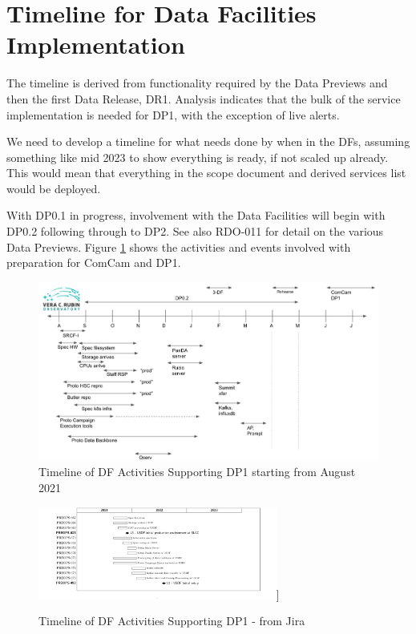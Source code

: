 
\section{Timeline for Data Facilities Implementation}\label{sec:timeline}

The timeline is derived from functionality required by the Data
Previews and then the first Data \gls{Release}, DR1. Analysis indicates that
the bulk of the service implementation is needed for \gls{DP1}, with the
exception of live alerts.

We need to develop a timeline for what needs done by when in the DFs, assuming something like mid 2023 to show everything is ready, if not scaled up already.
This would mean that everything in the scope document and derived services list would be deployed.

With \gls{DP0}.1 in progress, involvement with the Data Facilities will
begin with \gls{DP0}.2  following through to \gls{DP2}.
See also \gls{RDO}-011 for detail on the various Data Previews. Figure
\ref{timeline} shows the activities and events involved with
preparation for ComCam and DP1.

\begin{figure}
\includegraphics[width=\textwidth]{USDF-DP1_Timeline.jpg}
\caption{Timeline of DF Activities Supporting DP1 starting from August
2021}
\label{timeline}
\end{figure}

\begin{figure}
\includegraphics[width=0.7\textwidth]{USDFplan}]
\caption{Timeline of DF Activities Supporting DP1 - from Jira }
\label{gtimeline}
\end{figure}

